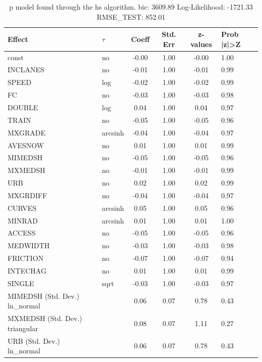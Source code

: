 \begin{table}
	\caption{p model found through the hs algorithm. bic: 3609.89 Log-Likelihood: -1721.33 RMSE_TEST: 852.01}
	\begin{center}
		\begin{tabular}{|l|l|c|c|c|l|}
			\hline
			Effect & $\tau$ & Coeff & Std. Err & z-values & Prob |z|>Z \\
			\hline
			const & no & -0.00 & 1.00 & -0.00 & 1.00 \\
			\hline
			INCLANES & no & -0.01 & 1.00 & -0.01 & 0.99 \\
			\hline
			SPEED & log & -0.02 & 1.00 & -0.02 & 0.99 \\
			\hline
			FC & no & -0.03 & 1.00 & -0.03 & 0.98 \\
			\hline
			DOUBLE & log & 0.04 & 1.00 & 0.04 & 0.97 \\
			\hline
			TRAIN & no & -0.05 & 1.00 & -0.05 & 0.96 \\
			\hline
			MXGRADE & arcsinh & -0.04 & 1.00 & -0.04 & 0.97 \\
			\hline
			AVESNOW & no & 0.01 & 1.00 & 0.01 & 0.99 \\
			\hline
			MIMEDSH & no & -0.05 & 1.00 & -0.05 & 0.96 \\
			\hline
			MXMEDSH & no & -0.01 & 1.00 & -0.01 & 0.99 \\
			\hline
			URB & no & 0.02 & 1.00 & 0.02 & 0.99 \\
			\hline
			MXGRDIFF & no & -0.04 & 1.00 & -0.04 & 0.97 \\
			\hline
			CURVES & arcsinh & 0.05 & 1.00 & 0.05 & 0.96 \\
			\hline
			MINRAD & arcsinh & 0.01 & 1.00 & 0.01 & 1.00 \\
			\hline
			ACCESS & no & -0.05 & 1.00 & -0.05 & 0.96 \\
			\hline
			MEDWIDTH & no & -0.03 & 1.00 & -0.03 & 0.98 \\
			\hline
			FRICTION & no & -0.07 & 1.00 & -0.07 & 0.94 \\
			\hline
			INTECHAG & no & 0.01 & 1.00 & 0.01 & 0.99 \\
			\hline
			SINGLE & sqrt & -0.03 & 1.00 & -0.03 & 0.97 \\
			\hline
			MIMEDSH (Std. Dev.) ln_normal &  & 0.06 & 0.07 & 0.78 & 0.43 \\
			\hline
			MXMEDSH (Std. Dev.) triangular &  & 0.08 & 0.07 & 1.11 & 0.27 \\
			\hline
			URB (Std. Dev.) ln_normal &  & 0.06 & 0.07 & 0.78 & 0.43 \\

\end{tabular}
\end{center}
\end{table}
